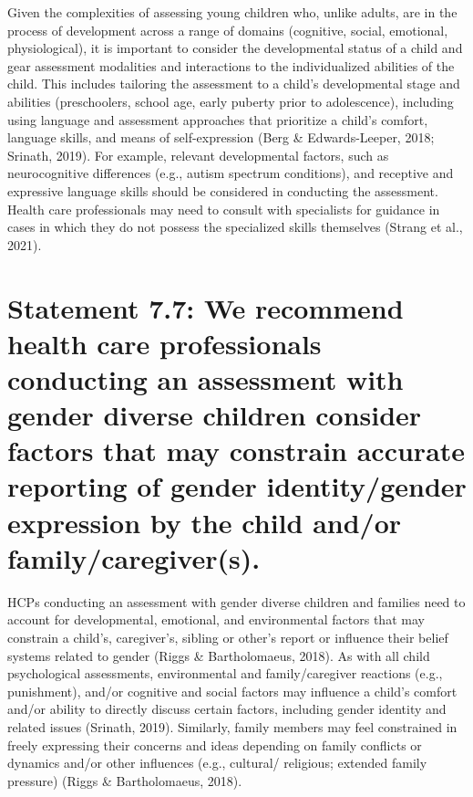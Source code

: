 \documentclass[
]{book}
\begin{document}
Given the complexities of assessing young
children who, unlike adults, are in the process
of development across a range of domains (cognitive, social, emotional, physiological), it is
important to consider the developmental status
of a child and gear assessment modalities and
interactions to the individualized abilities of the
child. This includes tailoring the assessment to
a child's developmental stage and abilities (preschoolers, school age, early puberty prior to
adolescence), including using language and
assessment approaches that prioritize a child's
comfort, language skills, and means of
self-expression (Berg \& Edwards-Leeper, 2018;
Srinath, 2019). For example, relevant developmental factors, such as neurocognitive differences (e.g., autism spectrum conditions), and
receptive and expressive language skills should
be considered in conducting the assessment.
Health care professionals may need to consult
with specialists for guidance in cases in which
they do not possess the specialized skills themselves (Strang et al., 2021).

\hypertarget{statement-7.7-we-recommend-health-care-professionals-conducting-an-assessment-with-gender-diverse-children-consider-factors-that-may-constrain-accurate-reporting-of-gender-identitygender-expression-by-the-child-andor-familycaregivers.}{%
\section*{Statement 7.7: We recommend health care professionals conducting an assessment with gender diverse children consider factors that may constrain accurate reporting of gender identity/gender expression by the child and/or family/caregiver(s).}\label{statement-7.7-we-recommend-health-care-professionals-conducting-an-assessment-with-gender-diverse-children-consider-factors-that-may-constrain-accurate-reporting-of-gender-identitygender-expression-by-the-child-andor-familycaregivers.}}

HCPs conducting an assessment with gender
diverse children and families need to account for
developmental, emotional, and environmental factors that may constrain a child's, caregiver's, sibling or other's report or influence their belief
systems related to gender (Riggs \& Bartholomaeus,
2018). As with all child psychological assessments, environmental and family/caregiver reactions (e.g., punishment), and/or cognitive and
social factors may influence a child's comfort
and/or ability to directly discuss certain factors,
including gender identity and related issues
(Srinath, 2019). Similarly, family members may
feel constrained in freely expressing their concerns and ideas depending on family conflicts or
dynamics and/or other influences (e.g., cultural/
religious; extended family pressure) (Riggs \&
Bartholomaeus, 2018).
\end{document}
